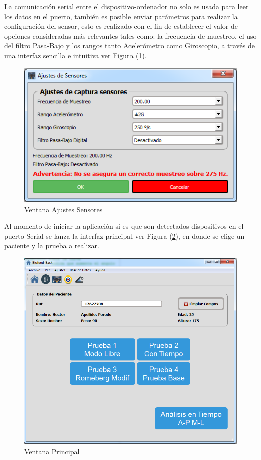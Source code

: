 \documentclass[12pt,a4paper]{article}
\begin{document}
La comunicación serial entre el dispositivo-ordenador no solo es usada para leer los datos en el puerto, también es posible enviar parámetros para realizar la configuración del sensor, esto es realizado con el fin de establecer el valor de opciones consideradas más relevantes tales como: la frecuencia de muestreo, el uso del filtro Pasa-Bajo y los rangos tanto Acelerómetro como Giroscopio, a través de una interfaz sencilla e intuitiva ver Figura (\ref{fig:ajustessensores}).

\begin{figure}[H]
	\centering
	\includegraphics[scale=0.6]{images/ajustesSensores}
	\caption{Ventana Ajustes Sensores}
	\label{fig:ajustessensores}
\end{figure}

Al momento de iniciar la aplicación si es que son detectados dispositivos en el puerto Serial se lanza la interfaz principal ver Figura (\ref{fig:mainwindow}), en donde se elige un paciente y la prueba a realizar.

\begin{figure}[H]
	\centering
	\includegraphics[scale=0.6]{images/mainwindow}
	\caption{Ventana Principal}
	\label{fig:mainwindow}
\end{figure}
\end{document}
